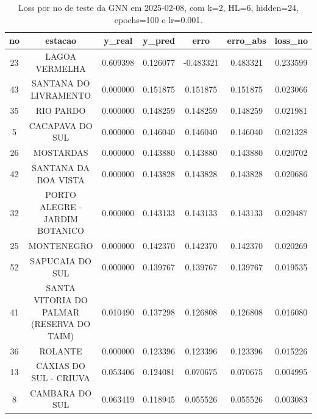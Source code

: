 \begin{table}[h]
\centering
\caption{Loss por no de teste da GNN em 2025-02-08, com k=2, HL=6, hidden=24, epochs=100 e lr=0.001.}
\label{tab:gnn_loss_k2_hl6_h24_e100_d20250208}
\begin{tabular}{ccccccc}
\toprule
no & estacao & y\_real & y\_pred & erro & erro\_abs & loss\_no \\
\midrule
23 & LAGOA VERMELHA & 0.609398 & 0.126077 & -0.483321 & 0.483321 & 0.233599 \\
43 & SANTANA DO LIVRAMENTO & 0.000000 & 0.151875 & 0.151875 & 0.151875 & 0.023066 \\
35 & RIO PARDO & 0.000000 & 0.148259 & 0.148259 & 0.148259 & 0.021981 \\
5 & CACAPAVA DO SUL & 0.000000 & 0.146040 & 0.146040 & 0.146040 & 0.021328 \\
26 & MOSTARDAS & 0.000000 & 0.143880 & 0.143880 & 0.143880 & 0.020702 \\
42 & SANTANA DA BOA VISTA & 0.000000 & 0.143828 & 0.143828 & 0.143828 & 0.020686 \\
32 & PORTO ALEGRE - JARDIM BOTANICO & 0.000000 & 0.143133 & 0.143133 & 0.143133 & 0.020487 \\
25 & MONTENEGRO & 0.000000 & 0.142370 & 0.142370 & 0.142370 & 0.020269 \\
52 & SAPUCAIA DO SUL & 0.000000 & 0.139767 & 0.139767 & 0.139767 & 0.019535 \\
41 & SANTA VITORIA DO PALMAR (RESERVA DO TAIM) & 0.010490 & 0.137298 & 0.126808 & 0.126808 & 0.016080 \\
36 & ROLANTE & 0.000000 & 0.123396 & 0.123396 & 0.123396 & 0.015226 \\
13 & CAXIAS DO SUL - CRIUVA & 0.053406 & 0.124081 & 0.070675 & 0.070675 & 0.004995 \\
8 & CAMBARA DO SUL & 0.063419 & 0.118945 & 0.055526 & 0.055526 & 0.003083 \\
\bottomrule
\end{tabular}
\end{table}
